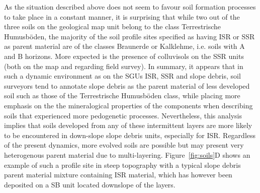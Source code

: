 \documentclass[preprint,12pt,authoryear]{elsarticle}
\begin{document}
As the situation described above does not seem to favour soil formation processes to take place in a constant manner, it is surprising that while two out of the three soils on the geological map unit belong to the class Terrestrische Humusb\"oden, the majority of the soil profile sites specified as having ISR or SSR as parent material are of the classes Braunerde or Kalklehme, i.e. soils with A and B horizons. More expected is the presence of colluvisols on the SSR units (both on the map and regarding field survey).  In summary, it appears that in such a dynamic environment as on the SGUs ISR, SSR and slope debris, soil surveyors tend to annotate slope debris as the parent material of less developed soil such as those of the Terrestrische Humusb\"oden class, while placing more emphasis on the the mineralogical properties of the components when describing soils that experienced more pedogenetic processes. Nevertheless, this analysis implies that soils developed from any of these intermittent layers are more likely to be encountered in down-slope slope debris units, especially for ISR. Regardless of the present dynamics, more evolved soils are possible but may present very heterogenous parent material due to multi-layering. Figure~\ref{fig:soils}D shows an example of such a profile site in steep topography with a typical slope debris parent material mixture containing ISR material, which has however been deposited on a SB unit located downslope of the layers.
\end{document}
